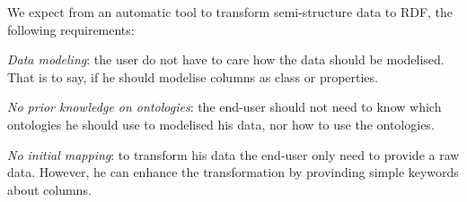



	






We expect from an automatic tool to transform semi-structure data to RDF, the following
requirements:
\begin{enumerate*}[label={\alph*)},font={\bfseries}]
	\item \emph{Data modeling}: the user do not have to care how the data should be 
	modelised. That is to say, if he should modelise columns as class or properties.
	\item \emph{No prior knowledge on ontologies}: the end-user should not need to
	know which ontologies he should use to modelised his data, nor how to use the 
	ontologies.
	\item \emph{No initial mapping}: to transform his data the end-user only need to
	provide a raw data. However, he can enhance the transformation by provinding
	simple keywords about columns.
\end{enumerate*}


